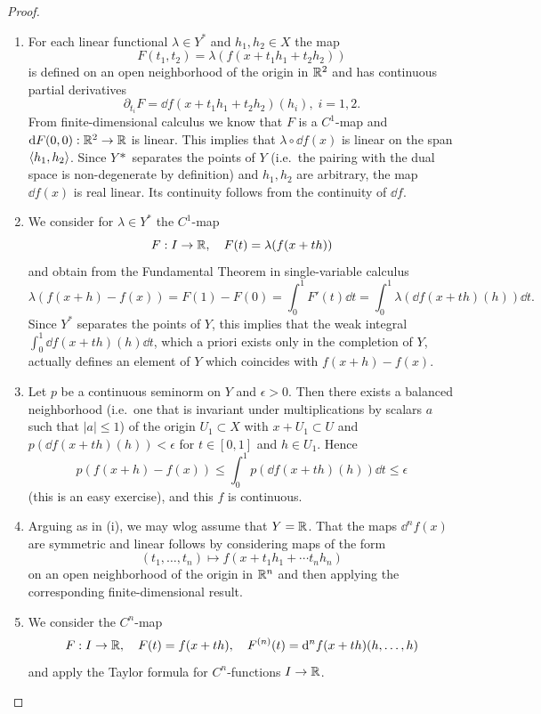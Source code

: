 \begin{proof}
    \begin{enumerate}[label=(\roman*)]
        \item For each linear functional $\lambda\in Y^\ast$ and $h_1,h_2\in X$ the map
        \[F(t_1,t_2)=\lambda(f(x+t_1h_1+t_2h_2))\]
        is defined on an open neighborhood of the origin in $\mathbb{R}^2$ and has continuous partial derivatives 
        \[\partial_{t_i}F=\dd f(x+t_1h_1+t_2h_2)(h_i),\; i=1,2.\]
        From finite-dimensional calculus we know that $F$ is a $C^1$-map and ${\mathrm{d}} F(0,0):\mathbb{R}^2\to \mathbb{R}$ is linear. This implies that $\lambda\circ \dd f(x)$ is linear on the span $\langle h_1,h_2\rangle$. Since $Y\ast$ separates the points of $Y$ (i.e.\ the pairing with the dual space is non-degenerate by definition) and $h_1,h_2$ are arbitrary, the map $\dd f(x)$ is real linear. Its continuity follows from the continuity of $\dd f$.

        \item We consider for $\lambda \in Y^\ast$ the $C^1$-map
        \[F:I\to \mathbb{R},\quad F(t)=\lambda(f(x+th))\]
        and obtain from the Fundamental Theorem in single-variable calculus
        \[\lambda(f(x+h)-f(x))=F(1)-F(0)=\int_0^1 F'(t)\dd t=\int_0^1 \lambda(\dd f(x+th)(h))\dd t.\]
        Since $Y^\ast$ separates the points of $Y$, this implies that the weak integral $\int_0^1 \dd f(x+th)(h)\dd t$, which a priori exists only in the completion of $Y$, actually defines an element of $Y$ which coincides with $f(x+h)-f(x)$.

        \item Let $p$ be a continuous seminorm on $Y$ and $\epsilon>0$. Then there exists a balanced neighborhood (i.e.\ one that is invariant under multiplications by scalars $a$ such that $|a|\leq 1$) of the origin $U_1\subset X$ with $x+U_1\subset U$ and $p(\dd f(x+th)(h))<\epsilon$ for $t\in[0,1]$ and $h\in U_1$. Hence
        \[p(f(x+h)-f(x))\leq \int_0^1 p(\dd f(x+th)(h))\dd t\leq \epsilon\]
        (this is an easy exercise), and this $f$ is continuous.
        
        \item Arguing as in (i), we may \gls{wlog} assume that $Y=\mathbb{R}$. That the maps $\dd^n f(x)$ are symmetric and linear follows by considering maps of the form
        \[(t_1,\ldots,t_n)\mapsto f(x+t_1h_1+\cdots t_nh_n)\]
        on an open neighborhood of the origin in $\mathbb{R}^n$ and then applying the corresponding finite-dimensional result.
        
        \item We consider the $C^n$-map
        \[F:I\to \mathbb{R}, \quad F(t)=f(x+th), \quad F^{(n)}(t)={\mathrm{d}}^n f(x+th)(h,\ldots,h)\]
        and apply the Taylor formula for $C^n$-functions $I\to \mathbb{R}$.
    \end{enumerate}
\end{proof}

